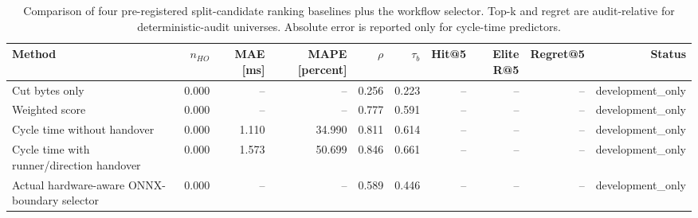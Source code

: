 \begin{table}[t]
\centering
\small
\caption{Comparison of four pre-registered split-candidate ranking baselines plus the workflow selector. Top-k and regret are audit-relative for deterministic-audit universes. Absolute error is reported only for cycle-time predictors.}
\label{tab:ranking-method-comparison}
\begin{tabular}{lrrrrrrrrr}
\toprule
Method & $n_{HO}$ & MAE [ms] & MAPE [percent] & $\rho$ & $\tau_b$ & Hit@5 & Elite R@5 & Regret@5 & Status \\
\midrule
Cut bytes only & 0.000 & -- & -- & 0.256 & 0.223 & -- & -- & -- & development\_only \\
Weighted score & 0.000 & -- & -- & 0.777 & 0.591 & -- & -- & -- & development\_only \\
Cycle time without handover & 0.000 & 1.110 & 34.990 & 0.811 & 0.614 & -- & -- & -- & development\_only \\
Cycle time with runner/direction handover & 0.000 & 1.573 & 50.699 & 0.846 & 0.661 & -- & -- & -- & development\_only \\
Actual hardware-aware ONNX-boundary selector & 0.000 & -- & -- & 0.589 & 0.446 & -- & -- & -- & development\_only \\
\bottomrule
\end{tabular}
\end{table}
